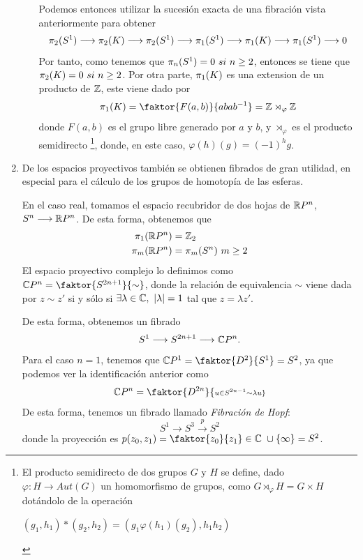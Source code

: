 \begin{enumerate}
\begin{enumerate}
Podemos entonces utilizar la sucesión exacta de una fibración vista anteriormente para obtener
\[
\homot{2}{S^1} \longrightarrow \homot{2}{K} \longrightarrow \homot{2}{S^1} \longrightarrow \homot{1}{S^1} \longrightarrow \homot{1}{K} \longrightarrow \homot{1}{S^1} \longrightarrow 0
\]
Por tanto, como tenemos que $\pi_{n}(S^1) = 0 \ si \ n \geq 2$, entonces  se tiene que $\homot{2}{K} = 0 \ si \ n \geq 2$. Por otra parte,  $\pi_{1}(K) $ es una extension de un producto de $\mathbb{Z}$, este viene dado por 
\[
\homot{1}{K} = \faktor{F(a,b)}{abab^{-1}} = \bb{Z} \rtimes_\varphi \bb{Z}
\]
donde $F(a,b)$ es el grupo libre generado por $a$ y $b$, y  $\rtimes_\varphi$ es el producto semidirecto \footnote{El producto semidirecto de dos grupos $G$ y $H$ se define, dado $\varphi : H \longrightarrow Aut(G)$ un homomorfismo de grupos, como $G \rtimes_\varphi H = G \times H$ dotándolo de la operación
\begin{center}
$(g_1, h_1) \ast (g_2, h_2) = (g_1 \varphi(h_1)(g_2), h_1 h_2)$
\end{center}}, donde, en este caso, $\varphi(h)(g) = (-1)^hg$.
\end{enumerate}
\item De los espacios proyectivos también se obtienen fibrados de gran utilidad, en especial para el cálculo de los grupos de homotopía de las esferas. \par
En el caso real, tomamos el espacio recubridor de dos hojas de $\mathbb{R}P^n$, $S^n \longrightarrow \bb{R}P^n$. De esta forma, obtenemos que 
\begin{align*}
\pi_{1}(\mathbb{R}P^n) &= \mathbb{Z}_2 \\
\pi_{m}(\mathbb{R}P^n) &= \pi_{m}(S^n) \ m \geq 2
\end{align*}
El espacio proyectivo complejo lo definimos como $\bb{C}P^n = \faktor{S^{2n+1}}{\sim}$, donde la relación de equivalencia $\sim$ viene dada por $z \sim z'$ si y sólo si $\exists \lambda \in \bb{C}, \ |\lambda| = 1$ tal que $z = \lambda z'$. \par
De esta forma, obtenemos un fibrado
\[
S^1 \longrightarrow S^{2n+1} \longrightarrow \bb{C}P^n.
\]
Para el caso $n = 1$, tenemos que $\bb{C}P^1 = \faktor{D^2}{S^1} = S^2$, ya que podemos ver la identificación anterior como 
\[
\bb{C}P^n = \faktor{D^{2n}}{\scriptstyle u \in S^{2n-1} \sim \lambda u}
\]
De esta forma, tenemos un fibrado llamado \textit{Fibración de Hopf}:
\[
S^1 \longrightarrow S^3 \stackrel{p}{\longrightarrow} S^2
\]
donde la proyección es $p(z_0, z_1) = \faktor{z_0}{z_1} \in \bb{C} \ \cup \{\infty \} = S^2$. \par

\end{enumerate}
